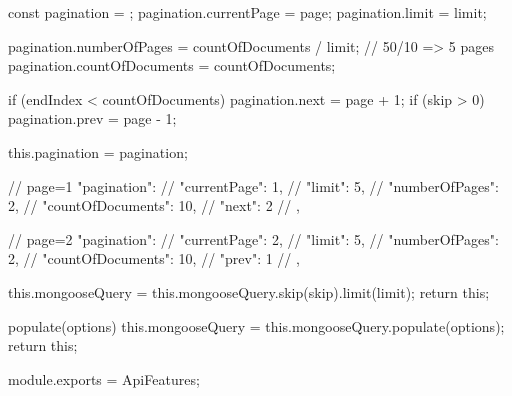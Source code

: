 {{                            const pagination = {};
                            pagination.currentPage = page;
                            pagination.limit = limit;

                            pagination.numberOfPages = countOfDocuments / limit; // 50/10 => 5 pages
                            pagination.countOfDocuments = countOfDocuments;

                            if (endIndex < countOfDocuments) {
                            pagination.next = page + 1;
                            }
                            if (skip > 0) {
                            pagination.prev = page - 1;
                            }

                            this.pagination = pagination;

                            //  page=1   "pagination": {
                            //                      "currentPage": 1,
                            //                        "limit": 5,
                            //                        "numberOfPages": 2,
                            //                        "countOfDocuments": 10,
                            //                        "next": 2
                            //                },

                            //  page=2  "pagination": {
                            //                  "currentPage": 2,
                            //                  "limit": 5,
                            //                  "numberOfPages": 2,
                            //                  "countOfDocuments": 10,
                            //                  "prev": 1
                            //                },

                            this.mongooseQuery = this.mongooseQuery.skip(skip).limit(limit);
                            return this;
                        }
                        populate(options) {
                            this.mongooseQuery = this.mongooseQuery.populate(options);
                            return this;
                        }
            }
            module.exports = ApiFeatures;


